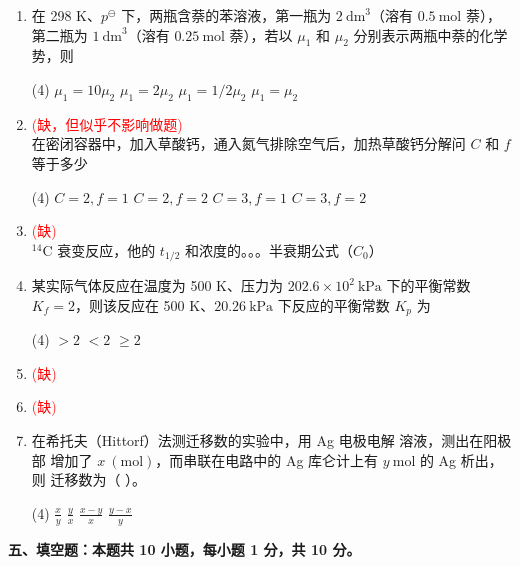 \begin{enumerate}[label=\arabic*., itemsep=1.5ex]
    \item 在 298 K、$p^\ominus$ 下，两瓶含萘的苯溶液，第一瓶为 $2\ \text{dm}^3$（溶有 $0.5\ \text{mol}$ 萘），第二瓶为 $1\ \text{dm}^3$（溶有 $0.25\ \text{mol}$ 萘），若以 $\mu_1$ 和 $\mu_2$ 分别表示两瓶中萘的化学势，则
    \begin{tasks}(4)
        \task $\mu_1 = 10 \mu_2$ 
        \task $\mu_1 = 2 \mu_2$ 
        \task $\mu_1 = 1/2 \mu_2$ 
        \task $\mu_1 = \mu_2$
    \end{tasks}
    \item \textcolor{red}{(缺，但似乎不影响做题)}\\
    在密闭容器中，加入草酸钙，通入氮气排除空气后，加热草酸钙分解问 $C$ 和 $f$ 等于多少
    \begin{tasks}(4)
        \task $C=2, f=1$
        \task $C=2, f=2$
        \task $C=3, f=1$
        \task $C=3, f=2$
    \end{tasks}

    \item \textcolor{red}{(缺)}\\
    $^{14}\text{C}$ 衰变反应，他的 $t_{1/2}$ 和浓度的。。。半衰期公式（$C_0$）

    \item 某实际气体反应在温度为 500 K、压力为 $202.6\times 10^2\ \text{kPa}$ 下的平衡常数 $K_f=2$，则该反应在 500 K、$20.26\ \text{kPa}$ 下反应的平衡常数 $K_p$ 为
    \begin{tasks}(4)
        \task $>2$
        \task $<2$
        \task $\ge 2$
    \end{tasks}

    \item \textcolor{red}{(缺)}

    \item \textcolor{red}{(缺)}

    \item 在希托夫（Hittorf）法测迁移数的实验中，用 Ag 电极电解  溶液，测出在阳极部  增加了 $x\ (\text{mol})$，而串联在电路中的 Ag 库仑计上有 $y\ \text{mol}$ 的 Ag 析出，则  迁移数为（ \quad ）。
    \begin{tasks}(4)
        \task $\frac{x}{y}$
        \task $\frac{y}{x}$
        \task $\frac{x-y}{x}$
        \task $\frac{y-x}{y}$
    \end{tasks}
\end{enumerate}

\vspace{0.5cm}
\noindent\textbf{五、填空题：本题共 10 小题，每小题 1 分，共 10 分。}

